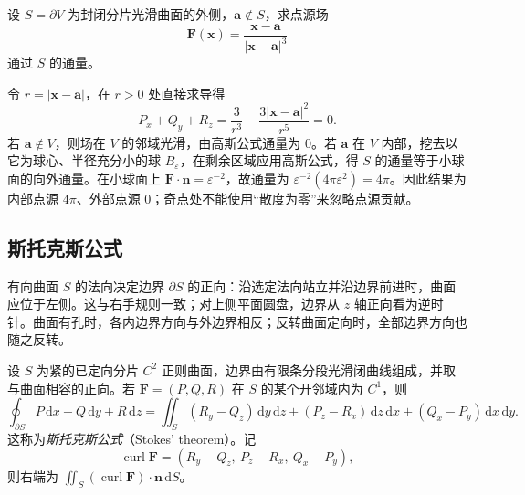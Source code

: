 \documentclass[UTF8,12pt,a4paper,fontset=fandol]{ctexbook}
\begin{document}
\begin{example}
\label{ex:gauss-point-source-flux}
设 $S=\partial V$ 为封闭分片光滑曲面的外侧，$\boldsymbol a\notin S$，求点源场
\[
    \boldsymbol F(\boldsymbol x)=\frac{\boldsymbol x-\boldsymbol a}{|\boldsymbol x-\boldsymbol a|^3}
\]
通过 $S$ 的通量。
\end{example}
\begin{solve}
令 $r=|\boldsymbol x-\boldsymbol a|$，在 $r>0$ 处直接求导得
\[
    P_x+Q_y+R_z=\frac3{r^3}-\frac{3|\boldsymbol x-\boldsymbol a|^2}{r^5}=0.
\]
若 $\boldsymbol a\notin V$，则场在 $V$ 的邻域光滑，由高斯公式通量为 $0$。若 $\boldsymbol a$ 在 $V$ 内部，挖去以它为球心、半径充分小的球 $B_\varepsilon$，在剩余区域应用高斯公式，得 $S$ 的通量等于小球面的向外通量。在小球面上 $\boldsymbol F\cdot\boldsymbol n=\varepsilon^{-2}$，故通量为 $\varepsilon^{-2}(4\pi\varepsilon^2)=4\pi$。因此结果为内部点源 $4\pi$、外部点源 $0$；奇点处不能使用“散度为零”来忽略点源贡献。
\end{solve}

\subsection{斯托克斯公式}
\label{subsec:stokes-formula}

有向曲面 $S$ 的法向决定边界 $\partial S$ 的正向：沿选定法向站立并沿边界前进时，曲面应位于左侧。这与右手规则一致；对上侧平面圆盘，边界从 $z$ 轴正向看为逆时针。曲面有孔时，各内边界方向与外边界相反；反转曲面定向时，全部边界方向也随之反转。

\begin{theorem}[斯托克斯公式]
\label{thm:stokes-formula}
设 $S$ 为紧的已定向分片 $C^2$ 正则曲面，边界由有限条分段光滑闭曲线组成，并取与曲面相容的正向。若 $\boldsymbol F=(P,Q,R)$ 在 $S$ 的某个开邻域内为 $C^1$，则
\begin{equation}
\label{eq:stokes-formula}
    \oint_{\partial S}P\,\mathrm dx+Q\,\mathrm dy+R\,\mathrm dz
    =\iint_S(R_y-Q_z)\,\mathrm dy\,\mathrm dz
      +(P_z-R_x)\,\mathrm dz\,\mathrm dx
      +(Q_x-P_y)\,\mathrm dx\,\mathrm dy.
\end{equation}
这称为\emph{斯托克斯公式}（Stokes' theorem）。记
\[
    \operatorname{curl}\boldsymbol F=(R_y-Q_z,\ P_z-R_x,\ Q_x-P_y),
\]
则右端为 $\iint_S(\operatorname{curl}\boldsymbol F)\cdot\boldsymbol n\,\mathrm dS$。
\end{theorem}
\end{document}
